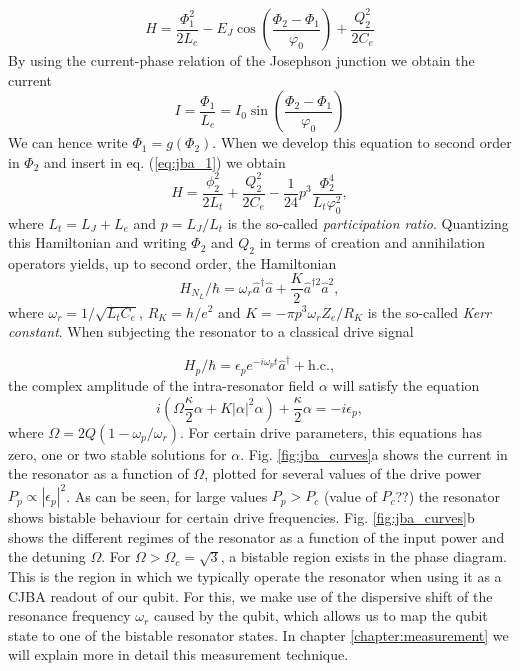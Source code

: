 %
\begin{equation}
H = \frac{\Phi_1^2}{2L_e}-E_J\cos{\left(\frac{\Phi_2-\Phi_1}{\varphi_0}\right)}+\frac{Q_2^2}{2C_e} \label{eq:jba_1}
\end{equation}
%
By using the current-phase relation of the Josephson junction we obtain the current
%
\begin{equation}
I = \frac{\Phi_1}{L_e} = I_0 \sin{\left(\frac{\Phi_2-\Phi_1}{\varphi_0}\right)}
\end{equation}
%
We can hence write $\Phi_1 = g(\Phi_2)$. When we develop this equation to second order in $\Phi_2$ and insert in eq. (\ref{eq:jba_1}) we obtain
%
\begin{equation}
H = \frac{\phi_2^2}{2L_t}+\frac{Q_2^2}{2C_e}-\frac{1}{24}p^3\frac{\Phi_2^4}{L_t \varphi_0^2},
\end{equation}
%
where $L_t = L_J+L_e$ and $p=L_J/L_t$ is the so-called {\it participation ratio}. Quantizing this Hamiltonian and writing $\Phi_2$ and $Q_2$ in terms of creation and annihilation operators yields, up to second order, the Hamiltonian
%
\begin{equation}
H_{N_L}/\hbar = \omega_r \hat{a}^\dagger \hat{a}+\frac{K}{2}\hat{a}^{\dagger 2}\hat{a}^2,
\end{equation}
%
where $\omega_r=1/\sqrt{L_t C_e}$, $R_K=h/e^2$ and $K=-\pi p^3 \omega_r Z_e / R_K$ is the so-called {\it Kerr constant}. When subjecting the resonator to a classical drive signal

%
\begin{equation}
H_p/\hbar = \epsilon_p e^{-i\omega_p t}\hat{a}^\dagger+\mathrm{h.c.},
\end{equation}
%
the complex amplitude of the intra-resonator field $\alpha$ will satisfy the equation 
%
\begin{equation}
i\left(\Omega\frac{\kappa}{2}\alpha+K|\alpha|^2\alpha\right)+\frac{\kappa}{2}\alpha = -i\epsilon_p,
\end{equation}
%
where $\Omega = 2Q\left(1-\omega_p/\omega_r\right)$. For certain drive parameters, this equations has zero, one or two stable solutions for $\alpha$. Fig. \ref{fig:jba_curves}a shows the current in the resonator as a function of $\Omega$, plotted for several values of the drive power $P_p\propto |\epsilon_p|^2$. As can be seen, for large values $P_p>P_c$ (value of $P_c$??) the resonator shows bistable behaviour for certain drive frequencies. Fig. \ref{fig:jba_curves}b shows the different regimes of the resonator as a function of the input power and the detuning $\Omega$.  For $\Omega > \Omega_c = \sqrt{3}$, a bistable region exists in the phase diagram. This is the region in which we typically operate the resonator when using it as a CJBA readout of our qubit. For this, we make use of the dispersive shift of the resonance frequency $\omega_r$ caused by the qubit, which allows us to map the qubit state to one of the bistable resonator states. In chapter \ref{chapter:measurement} we will explain more in detail this measurement technique.

